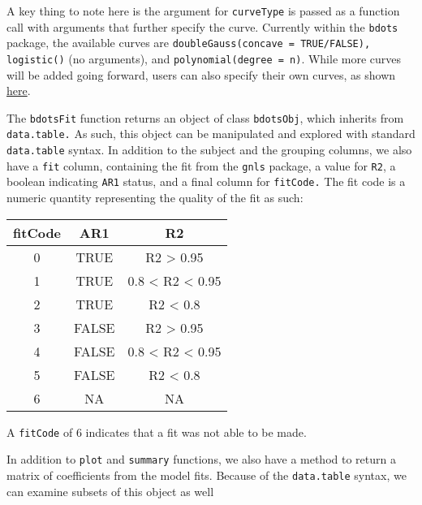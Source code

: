 \documentclass[
]{article}
\begin{document}
A key thing to note here is the argument for \texttt{curveType} is
passed as a function call with arguments that further specify the curve.
Currently within the \texttt{bdots} package, the available curves are
\texttt{doubleGauss(concave\ =\ TRUE/FALSE),} \texttt{logistic()} (no
arguments), and \texttt{polynomial(degree\ =\ n)}. While more curves
will be added going forward, users can also specify their own curves, as
shown \href{customCurves.html}{here}.

The \texttt{bdotsFit} function returns an object of class
\texttt{bdotsObj}, which inherits from \texttt{data.table.} As such,
this object can be manipulated and explored with standard
\texttt{data.table} syntax. In addition to the subject and the grouping
columns, we also have a \texttt{fit} column, containing the fit from the
\texttt{gnls} package, a value for \texttt{R2}, a boolean indicating
\texttt{AR1} status, and a final column for \texttt{fitCode.} The fit
code is a numeric quantity representing the quality of the fit as such:

\begin{longtable}[]{@{}ccc@{}}
\toprule()
fitCode & AR1 & R2 \\
\midrule()
\endhead
0 & TRUE & R2 \textgreater{} 0.95 \\
1 & TRUE & 0.8 \textless{} R2 \textless{} 0.95 \\
2 & TRUE & R2 \textless{} 0.8 \\
3 & FALSE & R2 \textgreater{} 0.95 \\
4 & FALSE & 0.8 \textless{} R2 \textless{} 0.95 \\
5 & FALSE & R2 \textless{} 0.8 \\
6 & NA & NA \\
\bottomrule()
\end{longtable}

A \texttt{fitCode} of 6 indicates that a fit was not able to be made.

In addition to \texttt{plot} and \texttt{summary} functions, we also
have a method to return a matrix of coefficients from the model fits.
Because of the \texttt{data.table} syntax, we can examine subsets of
this object as well
\end{document}
